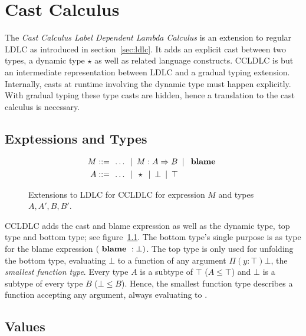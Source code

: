 \newcommand{\blame}{\text{ \textbf{blame} }}
\newcommand{\Single}{\text{ \textbf{S}}}

\chapter{Cast Calculus}\label{chap:cast-calculus}

The \emph{Cast Calculus Label Dependent Lambda Calculus} is an extension to regular LDLC as introduced in section~\ref{sec:ldlc}. It adds an explicit cast between two types, a dynamic type $\star$ as well as related language constructs. CCLDLC is but an intermediate representation between LDLC and a gradual typing extension. Internally, casts at runtime involving the dynamic type must happen explicitly. With gradual typing these type casts are hidden, hence a translation to the cast calculus is necessary.

\section{Exptessions and Types}\label{sec:cc-expressions}

\begin{figure}
\begin{align*}
 M ::= & \enspace \dots \enspace|\enspace
     M : A \Rightarrow B \enspace|\enspace \blame \\
 A ::= & \enspace \dots \enspace|\enspace
     \star \enspace|\enspace \bot \enspace|\enspace \top
\end{align*}
\caption{Extensions to LDLC for CCLDLC for expression $M$ and types $A, A', B, B'$.}
\label{fig:ccldlc-extensions}
\end{figure}

CCLDLC adds the cast and blame expression as well as the dynamic type, top type and bottom type; see figure~\ref{fig:ccldlc-extensions}.
The bottom type's single purpose is as type for the blame expression $(\blame : \bot)$. The top type is only used for unfolding the bottom type, evaluating $\bot$ to a function of any argument $\Pi(y:\top)\bot$, the \emph{smallest function type}. Every type $A$ is a subtype of $\top$ ($A \leq \top$) and $\bot$ is a subtype of every type $B$ ($\bot \leq B$). Hence, the smallest function type describes a function accepting any argument, always evaluating to \blame.

\section{Values}

